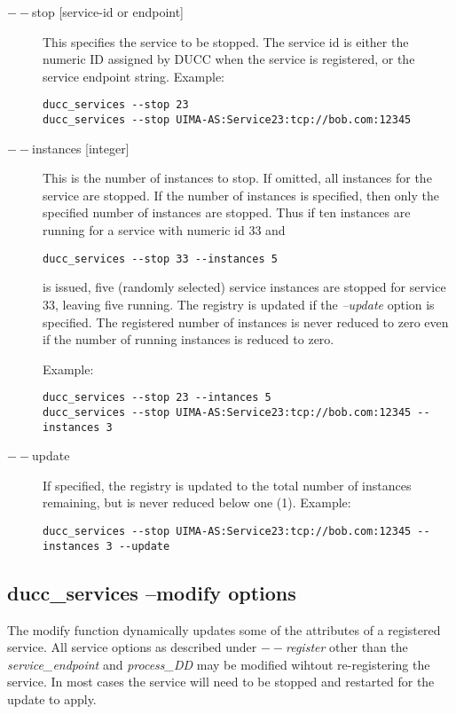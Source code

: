     \begin{description}

  \item[$--$stop {[service-id or endpoint]}] This specifies the service to be stopped. The service id
         is either the numeric ID assigned by DUCC when the service is registered, or the service
         endpoint string. Example:
\begin{verbatim}
ducc_services --stop 23 
ducc_services --stop UIMA-AS:Service23:tcp://bob.com:12345 
\end{verbatim}
         
       \item[$--$instances {[integer]}] This is the number of instances to stop. If omitted, all
         instances for the service are stopped.  If the number of instances is specified, then only
         the specified number of instances are stopped. Thus if ten instances are running for a
         service with numeric id 33 and
\begin{verbatim}
ducc_services --stop 33 --instances 5
\end{verbatim}
         is issued, five (randomly selected) service instances are stopped for
         service 33, leaving five running.  The registry is updated if the {\em --update} option is
         specified. The registered number of instances is never reduced to zero even if the number of
         running instances is reduced to zero.

         Example: 
\begin{verbatim}
ducc_services --stop 23 --intances 5 
ducc_services --stop UIMA-AS:Service23:tcp://bob.com:12345 --instances 3  
\end{verbatim}

       \item[$--$update] If specified, the registry is updated to the total number of instances
         remaining, but is never reduced below one (1). Example: 
\begin{verbatim}
ducc_services --stop UIMA-AS:Service23:tcp://bob.com:12345 --instances 3 --update
\end{verbatim}

    \end{description}

    \subsection{ducc\_services --modify options}
    The modify function dynamically updates some of the attributes of a registered service.  All
    service options as described under {\em $--$register} other than the {\em service\_endpoint} 
    and {\em process\_DD} may be modified wihtout re-registering the service.  In most cases the
    service will need to be stopped and restarted for the update to apply. 
    
